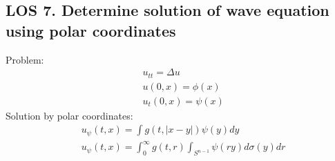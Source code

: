 \documentclass[12pt, a4paper]{article}
\begin{document}
\vspace{0.3em}

\subsection*{LOS 7. Determine solution of wave equation using polar coordinates}
Problem:
\begin{align*}
    &u_{tt} = \Delta u\\
    &u(0, x) = \phi(x)\\
    &u_t(0, x) = \psi(x)
\end{align*}
Solution by polar coordinates:
\begin{align*}
    &u_\psi(t, x) =\int g(t, |x-y|)\psi(y)dy\\
    &u_\psi(t, x) =\int_0^\infty g(t, r)\int_{S^{n-1}}\psi(ry)d\sigma(y)dr 
\end{align*}
\vspace{0.3em}
\end{document}

